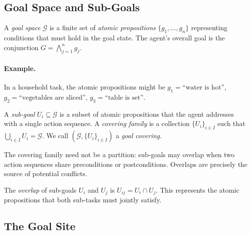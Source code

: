 \documentclass[11pt]{article}
\newcommand{\SubGoal}[1]{U_{#1}}
\newcommand{\GoalSpace}{\mathcal{G}}
\newcommand{\CoverFam}{\{U_i\}_{i \in I}}
\begin{document}
\subsection{Goal Space and Sub-Goals}\label{ssec:goal-space}

\begin{definition}\label{def:goal-space}
  A \emph{goal space} $\GoalSpace$ is a finite set of \emph{atomic
  propositions} $\{g_1, \ldots, g_n\}$ representing conditions
  that must hold in the goal state.  The agent's overall goal is
  the conjunction $G = \bigwedge_{j=1}^{n} g_j$.
\end{definition}

\paragraph{Example.}
In a household task, the atomic propositions might be $g_1 = \text{``water
is hot''}$, $g_2 = \text{``vegetables are sliced''}$,
$g_3 = \text{``table is set''}$.

\begin{definition}\label{def:subgoal}
  A \emph{sub-goal} $\SubGoal{i} \subseteq \GoalSpace$ is a subset
  of atomic propositions that the agent addresses with a single
  action sequence.  A \emph{covering family} is a collection
  $\CoverFam$ such that $\bigcup_{i \in I} \SubGoal{i} = \GoalSpace$.
  We call $(\GoalSpace, \CoverFam)$ a \emph{goal covering}.
\end{definition}

The covering family need not be a partition: sub-goals may overlap
when two action sequences share preconditions or postconditions.
Overlaps are precisely the source of potential conflicts.

\begin{definition}[Overlap]\label{def:overlap}
  The \emph{overlap} of sub-goals $\SubGoal{i}$ and $\SubGoal{j}$
  is $\SubGoal{ij} = \SubGoal{i} \cap \SubGoal{j}$.  This
  represents the atomic propositions that both sub-tasks must
  jointly satisfy.
\end{definition}

\subsection{The Goal Site}\label{ssec:goal-site-def}
\end{document}
